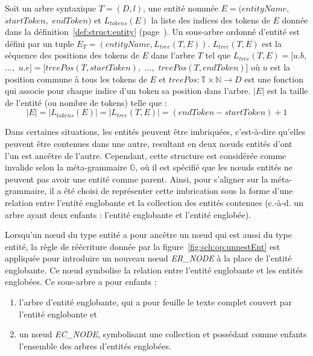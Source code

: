 \begin{definition}
    \label{def:struct:entity-tree}
    Soit un arbre syntaxique $T = (D, l)$, une entité nommée $E = (entityName,$ $startToken,$ $endToken)$ et $L_{tokens}(E)$ la liste des indices des tokens de $E$ donnée dans la définition~\ref{def:struct:entity} (page~\pageref{def:struct:entity}).
    Un sous-arbre ordonné d'entité est défini par un tuple $E_T = (entityName, L_{tree}(T, E))$.
    $L_{tree}(T, E)$ est la séquence des positions des tokens de $E$ dans l'arbre $T$ tel que $L_{tree}(T, E) = [u.b,$ $\dots,$ $u.e]= [treePos(T, startToken),$ $\dots,$ $treePos(T, endToken)]$ où $u$ est la position commune à tous les tokens de $E$ et $treePos : \mathbb{T} \times \mathbb{N} \to D$ est une fonction qui associe pour chaque indice d'un token sa position dans l'arbre.
    $|E|$ est la taille de l'entité (ou nombre de tokens) telle que :
    \[
        |E| = |L_{tokens}(E)| = |L_{tree}(T, E)| = (endToken - startToken) + 1
    \]
\end{definition}

Dans certaines situations, les entités peuvent être imbriquées, c'est-à-dire qu'elles peuvent être contenues dans une autre, resultant en deux nœuds entités d'ont l'un est ancêtre de l'autre.
Cependant, cette structure est considérée comme invalide selon la méta-grammaire $\mathbb{G}$, où il est spécifié que les nœuds entités ne peuvent pas avoir une entité comme parent.
Ainsi, pour s'aligner sur la méta-grammaire, il a été choisi de représenter cette imbrication sous la forme d'une relation entre l'entité englobante et la collection des entités contenues (c.-à-d. un arbre ayant deux enfants : l'entité englobante et l'entité englobée).

\begin{definition}
    \label{def:struct:nestedEnt}
    Lorsqu'un nœud du type entité a pour ancêtre un nœud qui est aussi du type entité, la règle de réécriture donnée par la figure~\ref{fig:sch:op:unnestEnt} est appliquée pour introduire un nouveau nœud \emph{ER\_NODE} à la place de l'entité englobante.
    Ce nœud symbolise la relation entre l'entité englobante et les entités englobées.
    Ce sous-arbre a pour enfants :
    \begin{enumerate}[label=(\roman*)]
        \item l'arbre d'entité englobante, qui a pour feuille le texte complet couvert par l'entité englobante et
        \item un nœud \emph{EC\_NODE}, symbolisant une collection et possédant comme enfants l'ensemble des arbres d'entités englobées.
    \end{enumerate}
\end{definition}

